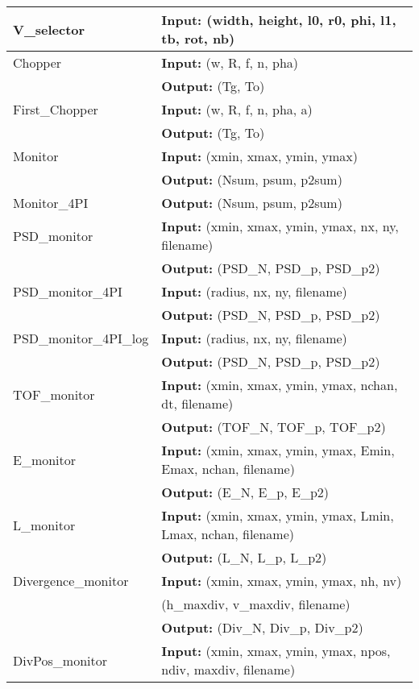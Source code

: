 \vfill
\begin{center}
\begin{tabular}{|ll|}
\hline
V\_selector & \textbf{Input:} (width, height, l0, r0, phi, l1, tb, rot, nb) \\
\hline
Chopper & \textbf{Input:} (w, R, f, n, pha) \\
 & \textbf{Output:} (Tg, To) \\
\hline
First\_Chopper & \textbf{Input:} (w, R, f, n, pha, a) \\
 & \textbf{Output:} (Tg, To) \\
\hline
Monitor & \textbf{Input:} (xmin, xmax, ymin, ymax) \\
 & \textbf{Output:} (Nsum, psum, p2sum) \\
\hline
Monitor\_4PI & \textbf{Output:} (Nsum, psum, p2sum) \\
\hline
PSD\_monitor & \textbf{Input:} (xmin, xmax, ymin, ymax, nx, ny, filename) \\
 & \textbf{Output:} (PSD\_N, PSD\_p, PSD\_p2) \\
\hline
PSD\_monitor\_4PI & \textbf{Input:} (radius, nx, ny, filename) \\
 & \textbf{Output:} (PSD\_N, PSD\_p, PSD\_p2) \\
\hline
PSD\_monitor\_4PI\_log & \textbf{Input:} (radius, nx, ny, filename) \\
 & \textbf{Output:} (PSD\_N, PSD\_p, PSD\_p2) \\
\hline
TOF\_monitor & \textbf{Input:} (xmin, xmax, ymin, ymax, nchan, dt, filename) \\
 & \textbf{Output:} (TOF\_N, TOF\_p, TOF\_p2) \\
\hline
E\_monitor & \textbf{Input:} (xmin, xmax, ymin, ymax, Emin, Emax, nchan, filename) \\
 & \textbf{Output:} (E\_N, E\_p, E\_p2) \\
\hline
L\_monitor & \textbf{Input:} (xmin, xmax, ymin, ymax, Lmin, Lmax, nchan, filename) \\
 & \textbf{Output:} (L\_N, L\_p, L\_p2) \\
\hline
Divergence\_monitor & \textbf{Input:} (xmin, xmax, ymin, ymax, nh, nv) \\
           & \phantom{\textbf{Input:}\ }(h\_maxdiv, v\_maxdiv, filename) \\
 & \textbf{Output:} (Div\_N, Div\_p, Div\_p2) \\
\hline
DivPos\_monitor & \textbf{Input:} (xmin, xmax, ymin, ymax, 
                       npos, ndiv, maxdiv, filename) \\

\end{tabular}
\end{center}
